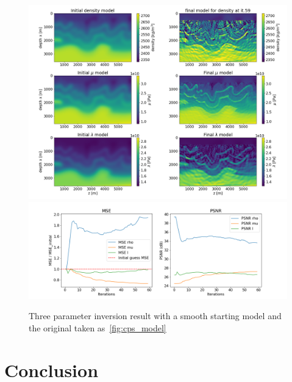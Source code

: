 \documentclass[10pt]{SelfArx} %
\theoremstyle{definition}
\begin{document}
\begin{figure}[!h]\label{fig:cps_fwi_smooth_start}
\hspace*{-0.6in}
\includegraphics[width=1.20\textwidth]{fig/cana_fwi_three_params_smooth}
\hspace*{-0.6in}
\includegraphics[width=1.20\textwidth]{fig/cana_fwi_three_params_smooth_MSE}
\caption{Three parameter inversion result with a smooth starting model and the original taken as~\cref{fig:cps_model}}
\end{figure}

\clearpage

\section{Conclusion}

\end{document}
